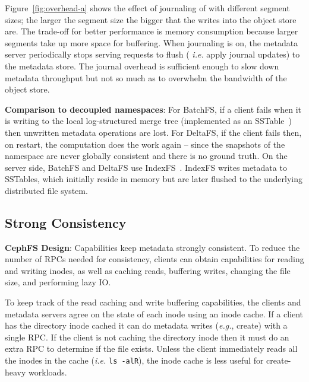 
Figure~\ref{fig:overhead-a} shows the effect of journaling of with different
segment sizes; the larger the segment size the bigger that the writes into the
object store are. The trade-off for better performance is memory consumption
because larger segments take up more space for buffering. When journaling is
on, the metadata server periodically stops serving requests to flush ({\it
i.e.} apply journal updates) to the metadata store.  The journal overhead is
sufficient enough to slow down metadata throughput but not so much as to
overwhelm the bandwidth of the object store. 

\textbf{Comparison to decoupled namespaces}: For BatchFS, if a client fails
when it is writing to the local log-structured merge tree (implemented as an
SSTable~\cite{ren:atc2013-tablefs}) then unwritten metadata operations are
lost. For DeltaFS, if the client fails then, on restart, the computation does
the work again -- since the snapshots of the namespace are never globally
consistent and there is no ground truth.  On the server side, BatchFS and
DeltaFS use IndexFS~\cite{ren:sc2014-indexfs}. IndexFS writes metadata to
SSTables, which initially reside in memory but are later flushed to the
underlying distributed file system.

\subsection{Strong Consistency}
\label{sec:strong-consistency}

\textbf{CephFS Design}: Capabilities keep metadata strongly
consistent. To reduce the number of RPCs needed for consistency, clients can
obtain capabilities for reading and writing inodes, as well as caching reads,
buffering writes, changing the file size, and performing lazy IO.

To keep track of the read caching and write buffering capabilities, the clients
and metadata servers agree on the state of each inode using an inode cache.  If
a client has the directory inode cached it can do metadata writes ({\it e.g.},
create) with a single RPC. If the client is not caching the directory inode
then it must do an extra RPC to determine if the file exists.  Unless the
client immediately reads all the inodes in the cache ({\it i.e.} \texttt{ls
-alR}), the inode cache is less useful for create-heavy workloads.

